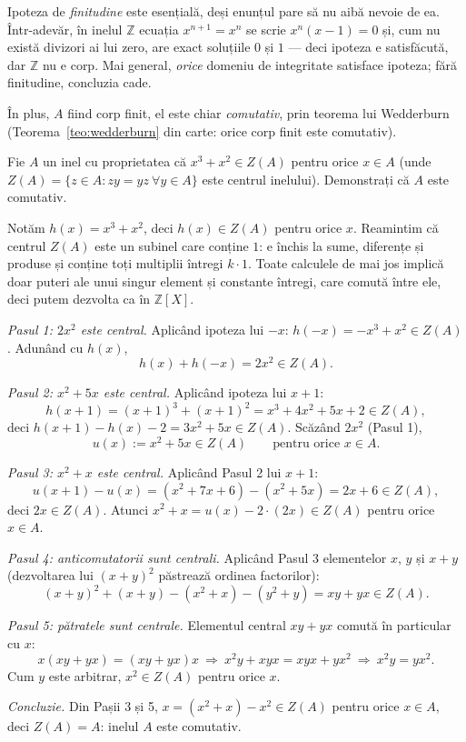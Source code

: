 \begin{obs}
Ipoteza de \emph{finitudine} este esențială, deși enunțul
pare să nu aibă nevoie de ea. Într-adevăr, în inelul
$\mathbb{Z}$ ecuația $x^{n+1}=x^{n}$ se scrie $x^{n}(x-1)=0$ și, cum nu
există divizori ai lui zero, are exact soluțiile $0$ și $1$ ---
deci ipoteza e satisfăcută, dar $\mathbb{Z}$ nu e corp. Mai general,
\emph{orice} domeniu de integritate satisface ipoteza; fără
finitudine, concluzia cade.

În plus, $A$ fiind corp finit, el este chiar \emph{comutativ}, prin
teorema lui Wedderburn (Teorema~\ref{teo:wedderburn} din carte: orice corp finit este
comutativ).
\end{obs}

\begin{problema}
Fie $A$ un inel cu proprietatea că $x^{3}+x^{2}\in Z(A)$ pentru orice
$x\in A$ (unde $Z(A)=\{z\in A: zy=yz\ \forall y\in A\}$ este centrul
inelului). Demonstrați că $A$ este comutativ.
\end{problema}

\begin{solutie}
Notăm $h(x)=x^{3}+x^{2}$, deci $h(x)\in Z(A)$ pentru orice $x$.
Reamintim că centrul $Z(A)$ este un subinel care conține $1$: e
închis la sume, diferențe și produse și conține toți multiplii
întregi $k\cdot 1$. Toate calculele de mai jos implică doar puteri ale
unui singur element și constante întregi, care comută între ele, deci
putem dezvolta ca în $\mathbb{Z}[X]$.

\smallskip
\textit{Pasul 1: $2x^{2}$ este central.} Aplicând ipoteza lui $-x$:
$h(-x)=-x^{3}+x^{2}\in Z(A)$. Adunând cu $h(x)$,
\[
  h(x)+h(-x)=2x^{2}\in Z(A).
\]

\smallskip
\textit{Pasul 2: $x^{2}+5x$ este central.} Aplicând ipoteza lui $x+1$:
\[
  h(x+1)=(x+1)^{3}+(x+1)^{2}=x^{3}+4x^{2}+5x+2\in Z(A),
\]
deci $h(x+1)-h(x)-2=3x^{2}+5x\in Z(A)$. Scăzând $2x^{2}$ (Pasul 1),
\[
  u(x):=x^{2}+5x\in Z(A)\qquad\text{pentru orice }x\in A.
\]

\smallskip
\textit{Pasul 3: $x^{2}+x$ este central.} Aplicând Pasul 2 lui $x+1$:
\[
  u(x+1)-u(x)=(x^{2}+7x+6)-(x^{2}+5x)=2x+6\in Z(A),
\]
deci $2x\in Z(A)$. Atunci $x^{2}+x=u(x)-2\cdot(2x)\in Z(A)$ pentru
orice $x\in A$.

\smallskip
\textit{Pasul 4: anticomutatorii sunt centrali.} Aplicând Pasul 3
elementelor $x$, $y$ și $x+y$ (dezvoltarea lui $(x+y)^{2}$ păstrează
ordinea factorilor):
\[
  (x+y)^{2}+(x+y)-(x^{2}+x)-(y^{2}+y)=xy+yx\in Z(A).
\]

\smallskip
\textit{Pasul 5: pătratele sunt centrale.} Elementul central $xy+yx$
comută în particular cu $x$:
\[
  x(xy+yx)=(xy+yx)x\ \Longrightarrow\ x^{2}y+xyx=xyx+yx^{2}
  \ \Longrightarrow\ x^{2}y=yx^{2}.
\]
Cum $y$ este arbitrar, $x^{2}\in Z(A)$ pentru orice $x$.

\smallskip
\textit{Concluzie.} Din Pașii 3 și 5,
$x=(x^{2}+x)-x^{2}\in Z(A)$ pentru orice $x\in A$, deci $Z(A)=A$:
inelul $A$ este comutativ.
\end{solutie}

